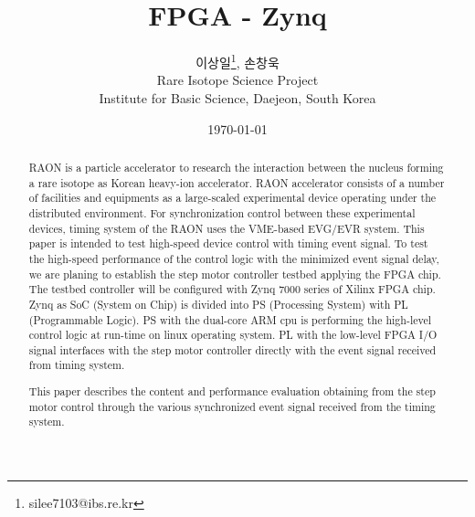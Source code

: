\documentclass[11pt
  , a4paper
  , article
  , oneside
]{memoir}
\begin{document}
\newcommand{\technumber}{
  RAON Control-Document Series\\
  Revision : v1.0,   Release : 2015-03-16 fixed date}
\title{\textbf{FPGA - Zynq}}

\author{이상일\thanks{silee7103@ibs.re.kr}, 손창욱 \\

  Rare Isotope Science Project\\
  Institute for Basic Science, Daejeon, South Korea
}
\date{\today}

\renewcommand{\maketitlehooka}{\begin{flushright}\textsf{\technumber}\end{flushright}}

\maketitle

\begin{abstract}
RAON is a particle accelerator to research the interaction between the nucleus forming a rare isotope as Korean heavy-ion accelerator. RAON accelerator consists of a number of facilities and equipments as a large-scaled experimental device operating under the distributed environment. For synchronization control between these experimental devices, timing system of the RAON uses the VME-based EVG/EVR system. This paper is intended to test high-speed device control with timing event signal. To test the high-speed performance of the control logic with the minimized event signal delay, we are planing to establish the step motor controller testbed applying the FPGA chip. The testbed controller will be configured with Zynq 7000 series of Xilinx FPGA chip. Zynq as SoC (System on Chip) is divided into PS (Processing System) with PL (Programmable Logic). PS with the dual-core ARM cpu is performing the high-level control logic at run-time on linux operating system. PL with the low-level FPGA I/O signal interfaces with the step motor controller directly with the event signal received from timing system.

This paper describes the content and performance evaluation obtaining from the step motor control through the various synchronized event signal received from the timing system.

\end{abstract}
\end{document}
